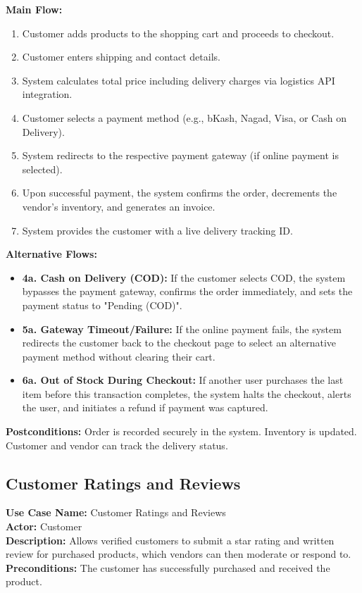 \vspace{0.2cm}
\textbf{Main Flow:} 
\begin{enumerate}
    \item Customer adds products to the shopping cart and proceeds to checkout.
    \item Customer enters shipping and contact details.
    \item System calculates total price including delivery charges via logistics API integration.
    \item Customer selects a payment method (e.g., bKash, Nagad, Visa, or Cash on Delivery).
    \item System redirects to the respective payment gateway (if online payment is selected).
    \item Upon successful payment, the system confirms the order, decrements the vendor's inventory, and generates an invoice.
    \item System provides the customer with a live delivery tracking ID.
\end{enumerate}

\textbf{Alternative Flows:}
\begin{itemize}
    \item \textbf{4a. Cash on Delivery (COD):} If the customer selects COD, the system bypasses the payment gateway, confirms the order immediately, and sets the payment status to "Pending (COD)".
    \item \textbf{5a. Gateway Timeout/Failure:} If the online payment fails, the system redirects the customer back to the checkout page to select an alternative payment method without clearing their cart.
    \item \textbf{6a. Out of Stock During Checkout:} If another user purchases the last item before this transaction completes, the system halts the checkout, alerts the user, and initiates a refund if payment was captured.
\end{itemize}

\vspace{0.2cm}
\textbf{Postconditions:} Order is recorded securely in the system. Inventory is updated. Customer and vendor can track the delivery status.


\vspace{0.5cm}
\subsection{Customer Ratings and Reviews}
\textbf{Use Case Name:} Customer Ratings and Reviews\\
\textbf{Actor:} Customer\\
\textbf{Description:} Allows verified customers to submit a star rating and written review for purchased products, which vendors can then moderate or respond to.\\
\textbf{Preconditions:} The customer has successfully purchased and received the product.


